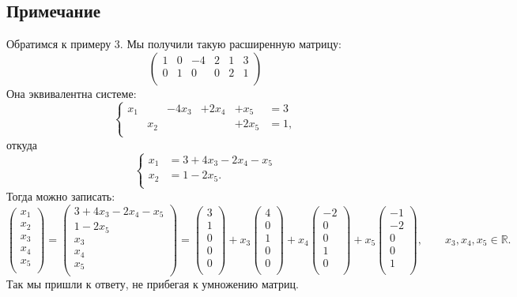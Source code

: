 \subsection{Примечание}
Обратимся к примеру 3. Мы получили такую расширенную матрицу:
$$
\left( \begin{array}{rrrrr|r}
1 & 0 & -4 & 2 & 1 & 3\\
0 & 1 & 0 & 0 & 2 & 1\\
\end{array} \right)
$$
Она эквивалентна системе:
$$
\left\{
\begin{array}{rrrrrrl}
x_1&&-4x_3&+2x_4&+x_5&=3\\
&x_2&&&+2x_5&=1,\\
\end{array}
\right.
$$
откуда
$$
\left\{
\begin{array}{rl}
x_1&=3+4x_3-2x_4-x_5\\
x_2&=1-2x_5.\\
\end{array}
\right.
$$
Тогда можно записать:
$$
\begin{pmatrix}
x_1\\
x_2\\
x_3\\
x_4\\
x_5\\
\end{pmatrix}
=
\begin{pmatrix}
3+4x_3-2x_4-x_5\\
1-2x_5\\
x_3\\
x_4\\
x_5\\
\end{pmatrix}
=
\begin{pmatrix}
3\\
1\\
0\\
0\\
0\\
\end{pmatrix}
+x_3
\begin{pmatrix}
4\\
0\\
1\\
0\\
0\\
\end{pmatrix}
+x_4
\begin{pmatrix}
-2\\
0\\
0\\
1\\
0\\
\end{pmatrix}
+x_5
\begin{pmatrix}
-1\\
-2\\
0\\
0\\
1\\
\end{pmatrix}
,\qquad x_3, x_4, x_5 \in \mathbb{R}.
$$
Так мы пришли к ответу, не прибегая к умножению матриц.